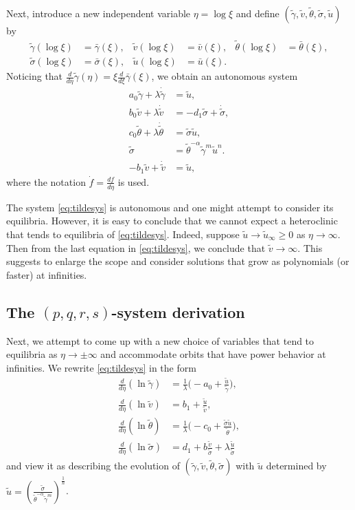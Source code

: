 \documentclass[usletter,11pt]{article}
\def\bg{{\bar{\gamma}}}
\def\bv{{\bar{v}}}
\def\bth{{\bar{\theta}}}
\def\bs{{\bar{\sigma}}}
\def\bu{{\bar{u}}}
\def\tg{{\tilde{\gamma}}}
\def\tv{{\tilde{v}}}
\def\tth{{\tilde{\theta}}}
\def\ts{{\tilde{\sigma}}}
\def\tu{{\tilde{u}}}
\def\dtg{{\dot{\tilde{\gamma}}}}
\def\dtv{{\dot{\tilde{v}}}}
\def\dtth{{\dot{\tilde{\theta}}}}
\def\dts{{\dot{\tilde{\sigma}}}}
\theoremstyle{remark}
\begin{document}
Next, introduce a new independent variable $\eta = \log\xi$ and define $(\tg,\tv,\tth,\ts,\tu)$ by
\begin{equation} \label{eq:BARtoTIL}
\begin{aligned}
 \tg(\log\xi)&=\bg(\xi), &
 \tv(\log\xi)&=\bv(\xi), &
 \tth(\log\xi)&=\bth(\xi), \\
 \ts(\log\xi)&=\bs(\xi), &
 \tu(\log\xi)&=\bu(\xi).
\end{aligned}
\end{equation}
Noticing that $\frac{d}{d\eta}\tg(\eta) = \xi \frac{d}{d\xi}\bg(\xi)$, we obtain an autonomous system
\begin{equation} \label{eq:tildesys}
 \begin{aligned}
  a_0\tg + \lambda\dtg &=\tu,\\
  b_0\tv + \lambda\dtv &=-d_1 \ts + \dts,\\
  c_0\tth+ \lambda\dtth&=\ts\tu,\\
  \ts &=\tth^{-\alpha}\tg^m\tu^n.\\
  -b_1\tv+\dtv &= \tu,
 \end{aligned}
\end{equation}
where the notation $\dot{f}=\frac{df}{d\eta}$ is used.

The system \eqref{eq:tildesys} is autonomous and one might attempt to consider its equilibria. 
However, it is easy to conclude that we cannot expect a heteroclinic that  tends to equilibria of \eqref{eq:tildesys}.
Indeed, suppose $\tu \rightarrow \tu_\infty\ge 0$ as $\eta \rightarrow \infty$. 
Then from the last equation in \eqref{eq:tildesys}, 
we conclude that $\tv \rightarrow \infty$. %
This suggests to enlarge the scope and consider solutions that grow as polynomials (or faster) at infinities.




\subsection{The $(p,q,r,s)$-system derivation}
Next, we attempt to come up with a new choice of variables that tend to equilibria as $\eta \rightarrow \pm \infty$ and accommodate
orbits that have power behavior at infinities. We rewrite \eqref{eq:tildesys} in the form
\begin{equation}
 \label{eq:tildesys2}
\begin{aligned}
\frac{d}{d\eta}{(\ln{\tg})}  &=  \tfrac{1}{\lambda} \big (- a_0 +  \frac{\tu}{\tg} \big ),
\\
 \frac{d}{d\eta}{(\ln{\tv})}  &=   b_1 + \frac{\tu}{\tv} , 
\\
\frac{d}{d\eta}{(\ln{\tth})} &=   \tfrac{1}{\lambda} \big (- c_0 +  \frac{\ts \tu}{\tth} \big ), 
\\
\frac{d}{d\eta}{( \ln{\ts}  )} &= d_1 + b \frac{\tv}{\ts} +   \lambda \frac{\tu}{\ts}  
\end{aligned}
\end{equation}
and view it as describing the evolution of $(\tg,\tv,\tth,\ts)$ with $\tu$ determined by $\tu = \left ( \frac{\ts}{ \tth^{-\alpha} \tg^m} \right )^\frac{1}{n}$.
\end{document}
